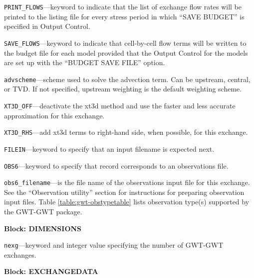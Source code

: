 \begin{description}
\item \texttt{PRINT\_FLOWS}---keyword to indicate that the list of exchange flow rates will be printed to the listing file for every stress period in which ``SAVE BUDGET'' is specified in Output Control.

\item \texttt{SAVE\_FLOWS}---keyword to indicate that cell-by-cell flow terms will be written to the budget file for each model provided that the Output Control for the models are set up with the ``BUDGET SAVE FILE'' option.

\item \texttt{advscheme}---scheme used to solve the advection term.  Can be upstream, central, or TVD.  If not specified, upstream weighting is the default weighting scheme.

\item \texttt{XT3D\_OFF}---deactivate the xt3d method and use the faster and less accurate approximation for this exchange.

\item \texttt{XT3D\_RHS}---add xt3d terms to right-hand side, when possible, for this exchange.

\item \texttt{FILEIN}---keyword to specify that an input filename is expected next.

\item \texttt{OBS6}---keyword to specify that record corresponds to an observations file.

\item \texttt{obs6\_filename}---is the file name of the observations input file for this exchange. See the ``Observation utility'' section for instructions for preparing observation input files. Table \ref{table:gwt-obstypetable} lists observation type(s) supported by the GWT-GWT package.

\end{description}
\item \textbf{Block: DIMENSIONS}

\begin{description}
\item \texttt{nexg}---keyword and integer value specifying the number of GWT-GWT exchanges.

\end{description}
\item \textbf{Block: EXCHANGEDATA}

